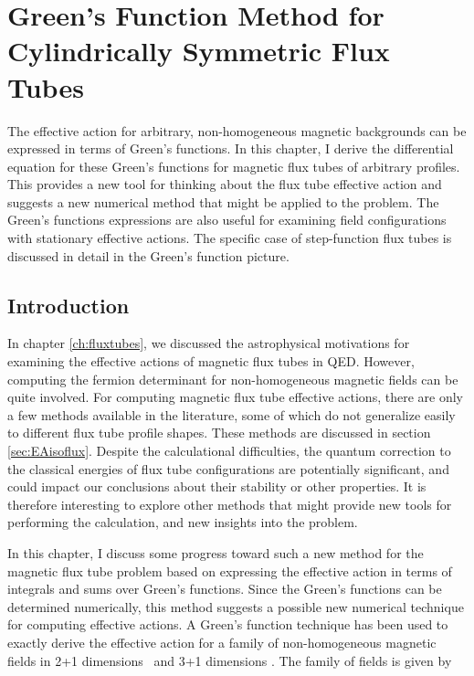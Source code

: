 \chapter{Green's Function Method for Cylindrically Symmetric Flux Tubes}
\label{ch:greensfunc}
\acresetall

\begin{summary}
	The effective action for arbitrary, non-homogeneous magnetic backgrounds can be expressed in terms 
	of Green's functions. In this chapter, I derive the differential equation 
	for these Green's functions for magnetic flux tubes of arbitrary profiles. This provides a 
	new tool for thinking about the flux tube effective action and suggests a new numerical 
	method that might be applied to the problem. 
	The Green's functions expressions are also useful for examining 
	field configurations with stationary effective actions. The specific case of step-function 
	flux tubes is discussed in detail in the Green's function picture.
\end{summary}

\section{Introduction}
In chapter \ref{ch:fluxtubes}, we discussed the astrophysical motivations for examining 
the effective actions of magnetic flux tubes in \ac{QED}. However, computing the fermion 
determinant for non-homogeneous magnetic fields can be quite involved. For computing magnetic 
flux tube effective actions, there are only a few methods available in the literature, some 
of which do not generalize easily to different flux tube profile shapes. These methods are 
discussed in section \ref{sec:EAisoflux}. Despite the calculational difficulties, 
the quantum correction to the classical energies of flux tube configurations are potentially 
significant, and could impact our conclusions about their stability or other properties. 
It is therefore interesting to explore other methods 
that might provide new tools for performing the calculation, and new insights into the problem.

In this chapter, I discuss some progress toward such a new method for the magnetic flux tube 
problem based on expressing the effective action in terms of integrals and sums over 
Green's functions. Since the Green's functions can be determined numerically, this 
method suggests a possible new numerical technique for computing effective actions. 
A Green's function technique has been used to exactly derive the effective action for a family of 
non-homogeneous magnetic fields in 2+1 dimensions~\cite{PhysRevD.52.R3163} and 3+1 dimensions
\cite{1998PhLB..419..322D}. The family of fields is given by 

